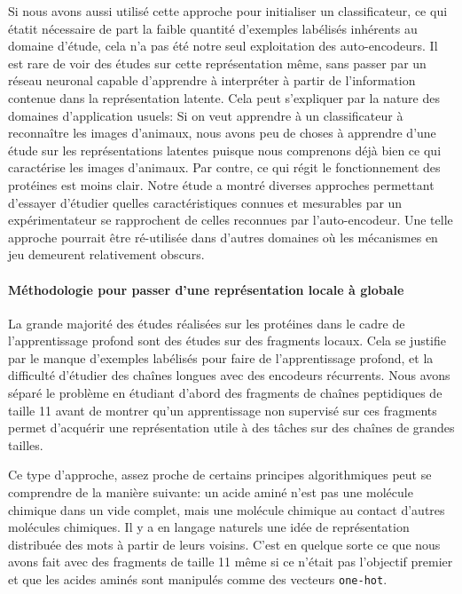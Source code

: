 \documentclass[a4paper, 11pt, onecolumn]{article}
\begin{document}
Si nous avons aussi utilisé cette approche pour initialiser un classificateur,
ce qui étatit nécessaire de part la faible quantité d'exemples labélisés
inhérents au domaine d'étude, cela n'a pas été notre seul exploitation des
auto-encodeurs. Il est rare de voir des études sur cette représentation même,
sans passer par un réseau neuronal capable d'apprendre à interpréter à partir de
l'information contenue dans la représentation latente. Cela peut s'expliquer par
la nature des domaines d'application usuels: Si on veut apprendre à un
classificateur à reconnaître les images d'animaux, nous avons peu de choses à
apprendre d'une étude sur les représentations latentes puisque nous comprenons
déjà bien ce qui caractérise les images d'animaux. Par contre, ce qui régit le
fonctionnement des protéines est moins clair. Notre étude a montré diverses
approches permettant d'essayer d'étudier quelles caractéristiques connues et
mesurables par un expérimentateur se rapprochent de celles reconnues par
l'auto-encodeur. Une telle approche pourrait être ré-utilisée dans d'autres
domaines où les mécanismes en jeu demeurent relativement obscurs.

\paragraph{Méthodologie pour passer d'une représentation locale à globale}

La grande majorité des études réalisées sur les protéines dans le cadre de
l'apprentissage profond sont des études sur des fragments locaux. Cela se
justifie par le manque d'exemples labélisés pour faire de l'apprentissage
profond, et la difficulté d'étudier des chaînes longues avec des encodeurs
récurrents. Nous avons séparé le problème en étudiant d'abord des fragments de
chaînes peptidiques de taille 11 avant de montrer qu'un apprentissage non
supervisé sur ces fragments permet d'acquérir une représentation utile à des
tâches sur des chaînes de grandes tailles.

Ce type d'approche, assez proche de certains principes algorithmiques peut se
comprendre de la manière suivante: un acide aminé n'est pas une molécule
chimique dans un vide complet, mais une molécule chimique au contact d'autres
molécules chimiques. Il y a en langage naturels une idée de représentation
distribuée des mots à partir de leurs voisins. C'est en quelque sorte ce que
nous avons fait avec des fragments de taille 11 même si ce n'était pas
l'objectif premier et que les acides aminés sont manipulés comme des vecteurs
\texttt{one-hot}. 
\end{document}
